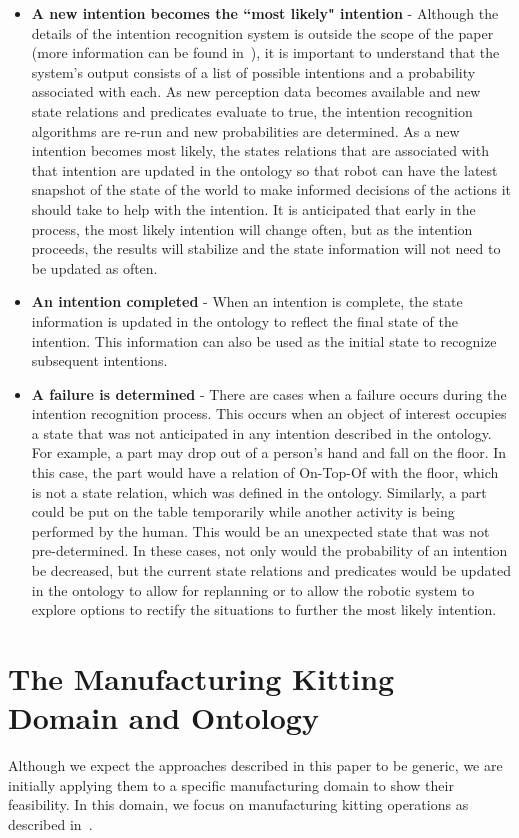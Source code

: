 \documentclass[preprint,12pt]{elsarticle}
\begin{document}
\begin{itemize}
\item \textbf{A new intention becomes the ``most likely" intention} - Although the details of the intention recognition system is outside the scope of the paper (more information can be found in~\cite{SCHLENOFF.ECDRM.2012}), it is important to understand that the system's output consists of a list of possible intentions and a probability associated with each. As new perception data becomes available and new state relations and predicates evaluate to true, the intention recognition algorithms are re-run and new probabilities are determined. As a new intention becomes most likely, the states relations that are associated with that intention are updated in the ontology so that robot can have the latest snapshot of the state of the world to make informed decisions of the actions it should take to help with the intention. It is anticipated that early in the process, the most likely intention will change often, but as the intention proceeds, the results will stabilize and the state information will not need to be updated as often.
\item \textbf{An intention completed} - When an intention is complete, the state information is updated in the ontology to reflect the final state of the intention. This information can also be used as the initial state to recognize subsequent intentions.
\item \textbf{A failure is determined} - There are cases when a failure occurs during the intention recognition process. This occurs when an object of interest occupies a state that was not anticipated in any intention described in the ontology. For example, a part may drop out of a person's hand and fall on the floor. In this case, the part would have a relation of On-Top-Of with the floor, which is not a state relation, which was defined in the ontology. Similarly, a part could be put on the table temporarily while another activity is being performed by the human. This would be an unexpected state that was not pre-determined. In these cases, not only would the probability of an intention be decreased, but the current state relations and predicates would be updated in the ontology to allow for replanning or to allow the robotic system to explore options to rectify the situations to further the most likely intention.
\end{itemize}


\section{The Manufacturing Kitting Domain and Ontology}\label{S:section3}
Although we expect the approaches described in this paper to be generic, we are initially applying them to a specific manufacturing domain to show their feasibility. In this domain, we focus on manufacturing kitting operations as described in~\cite{Balakirsky.IROS.2012}.
\end{document}

